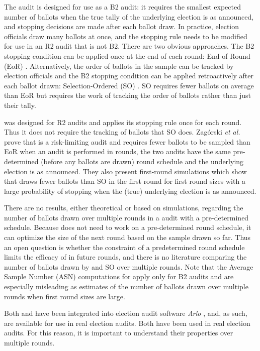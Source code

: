 The \BRAVO audit is designed for use as a B2 audit: it requires the smallest expected number of ballots when the true tally of the underlying election is as announced, and stopping decisions are made after each ballot draw. In practice, election officials draw many ballots at once, and the \BRAVO stopping rule needs to be modified for use in an R2 audit that is not B2. There are two obvious approaches. The B2 stopping condition can be applied once at the end of each round: End-of Round (EoR) \BRAVO.  Alternatively, the order of ballots in the sample can be tracked by election officials and the B2 \BRAVO stopping condition can be applied retroactively after each ballot drawn: Selection-Ordered (SO) \BRAVO. SO \BRAVO requires fewer ballots on average than EoR \BRAVO but requires the work of tracking the order of ballots rather than just their tally. 

\Minerva was designed for R2 audits and applies its stopping rule once for each round. Thus it does not require the tracking of ballots that SO \BRAVO does. Zag{\'o}rski {\em et al.} \cite{usenix_minerva} prove that \Minerva is a risk-limiting audit and requires fewer ballots to be sampled than EoR \BRAVO when an audit is performed in rounds, the two audits have the same pre-determined (before any ballots are drawn) round schedule and the underlying election is as announced. They also present first-round simulations which show that \Minerva draws fewer ballots than SO \BRAVO in the first round for first round sizes with a large probability of stopping when the (true) underlying election is as announced. 

There are no results, either theoretical or based on simulations, regarding the number of ballots drawn over multiple rounds in a \Minerva audit with a pre-determined schedule. Because \BRAVO does not need to work on a pre-determined round schedule, it can optimize the size of the next round based on the sample drawn so far. Thus an open question is whether the constraint of a predetermined round schedule limits the efficacy of \Minerva in future rounds, and there is no literature comparing the number of ballots drawn by \Minerva and SO \BRAVO over multiple rounds. Note that the Average Sample Number (ASN) computations for \BRAVO \cite{bravo} apply only for B2 audits and are especially misleading as estimates of the number of ballots drawn over multiple rounds when first round sizes are large. 

Both \BRAVO and \Minerva have been integrated into election audit software {\em Arlo} \cite{arlo}, and, as such, are available for use in real election audits. Both have been used in real election audits\cite{usenix_minerva, virginia_rla}. For this reason, it is important to understand their properties over multiple rounds. 

